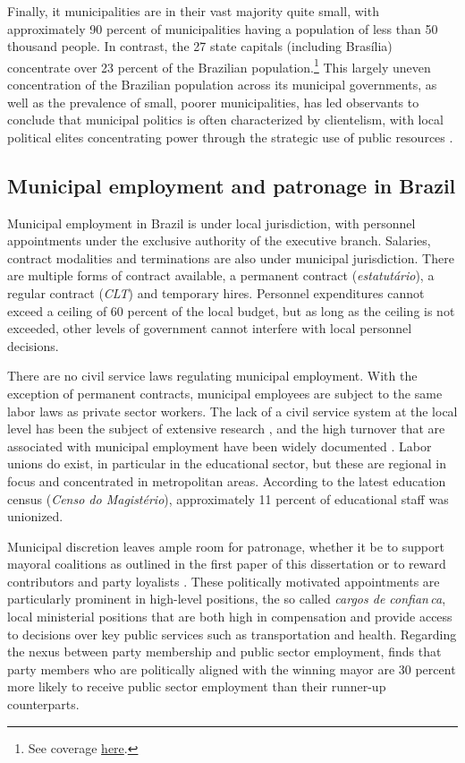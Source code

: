 \documentclass[12pt,a4paper]{article}
\begin{document}
Finally, it municipalities are in their vast majority quite small, with approximately 90 percent of municipalities having a population of less than 50 thousand people. In contrast, the 27 state capitals (including Bras\'{i}lia) concentrate over 23 percent of the Brazilian population.\footnote{See coverage \href{https://www.google.com/search?q=tamanho+municipio+brasil+poulacao&source=lmns&hl=en&sa=X&ved=2ahUKEwjyiLjLh6buAhXFn-AKHbzEBxAQ_AUoAHoECAEQAA}{here}.} This largely uneven concentration of the Brazilian population across its municipal governments, as well as the prevalence of small, poorer municipalities, has led observants to conclude that municipal politics is often characterized by clientelism, with local political elites concentrating power through the strategic use of public resources \citep{leal2012coronelismo}.

\subsection{Municipal employment and patronage in Brazil}

Municipal employment in Brazil is under local jurisdiction, with personnel appointments under the exclusive authority of the executive branch. Salaries, contract modalities and terminations are also under municipal jurisdiction. There are multiple forms of contract available, a permanent contract (\emph{estatut\'{a}rio}), a regular contract (\emph{CLT}) and temporary hires. Personnel expenditures cannot exceed a ceiling of 60 percent of the local budget, but as long as the ceiling is not exceeded, other levels of government cannot interfere with local personnel decisions.

There are no civil service laws regulating municipal employment. With the exception of permanent contracts, municipal employees are subject to the same labor laws as private sector workers. The lack of a civil service system at the local level has been the subject of extensive research \citep{souza2004governos}, and the high turnover that are associated with municipal employment have been widely documented \citep{akhtari2017political}. Labor unions do exist, in particular in the educational sector, but these are regional in focus and concentrated in metropolitan areas. According to the latest education census (\emph{Censo do Magist\'{e}rio}), approximately 11 percent of educational staff was unionized.

Municipal discretion leaves ample room for patronage, whether it be to support mayoral coalitions as outlined in the first paper of this dissertation or to reward contributors and party loyalists \citep{colonnelli2018patronage,brollo2017victor}. These politically motivated appointments are particularly prominent in high-level positions, the so called \emph{cargos de confian\,{c}a}, local ministerial positions that are both high in compensation and provide access to decisions over key public services such as transportation and health. Regarding the nexus between party membership and public sector employment, \citet{brollo2017victor} finds that party members who are politically aligned with the winning mayor are 30 percent more likely to receive public sector employment than their runner-up counterparts.
\end{document}
